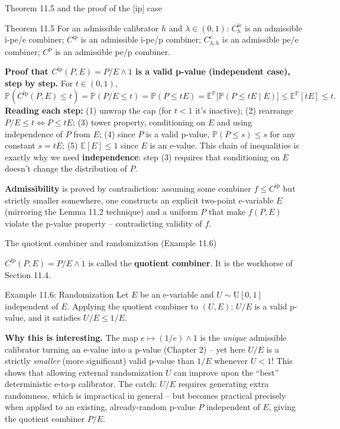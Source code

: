 \documentclass[aspectratio=169,10pt]{beamer}
\newcommand{\PP}{\mathbb{P}}
\newcommand{\EE}{\mathbb{E}}
\newcommand{\1}{\mathbb{1}}
\begin{document}
\begin{frame}[allowframebreaks]{Theorem 11.5 and the proof of the [ip] case}

\begin{block}{Theorem 11.5}
For an admissible calibrator $h$ and $\lambda\in(0,1)$: $C^{\mathrm{ie}}_h$ is an admissible i-pe/e combiner; $C^{\mathrm{ip}}$ is an admissible i-pe/p combiner; $C^{\mathrm e}_{\lambda,h}$ is an admissible pe/e combiner; $C^{\mathrm p}$ is an admissible pe/p combiner.
\end{block}

\textbf{Proof that $C^{\mathrm{ip}}(P,E)=P/E\wedge 1$ is a valid p-value (independent case), step by step.} For $t\in(0,1)$,
\[
\PP(C^{\mathrm{ip}}(P,E)\le t) = \PP(P/E\le t) = \PP(P \le tE) = \EE^\PP\bigl[\PP(P\le tE \mid E)\bigr] \le \EE^\PP[tE] \le t.
\]
\textbf{Reading each step:} (1) unwrap the cap (for $t<1$ it's inactive); (2) rearrange $P/E\le t \Leftrightarrow P\le tE$; (3) tower property, conditioning on $E$ and using independence of $P$ from $E$; (4) since $P$ is a valid p-value, $\PP(P\le s)\le s$ for any constant $s=tE$; (5) $\EE[E]\le 1$ since $E$ is an e-value. This chain of inequalities is exactly why we need \textbf{independence}: step (3) requires that conditioning on $E$ doesn't change the distribution of $P$.

\textbf{Admissibility} is proved by contradiction: assuming some combiner $f\le C^{\mathrm{ip}}$ but strictly smaller somewhere, one constructs an explicit two-point e-variable $E$ (mirroring the Lemma 11.2 technique) and a uniform $P$ that make $f(P,E)$ violate the p-value property -- contradicting validity of $f$.

\end{frame}

\begin{frame}[allowframebreaks]{The quotient combiner and randomization (Example 11.6)}

$C^{\mathrm{ip}}(P,E) = P/E \wedge 1$ is called the \textbf{quotient combiner}. It is the workhorse of Section 11.4.

\begin{block}{Example 11.6: Randomization}
Let $E$ be an e-variable and $U\sim \mathrm{U}[0,1]$ independent of $E$. Applying the quotient combiner to $(U,E)$: $U/E$ is a valid p-value, and it satisfies $U/E \le 1/E$.
\end{block}

\textbf{Why this is interesting.} The map $e\mapsto (1/e)\wedge 1$ is the \emph{unique} admissible calibrator turning an e-value into a p-value (Chapter 2) -- yet here $U/E$ is a strictly \emph{smaller} (more significant) valid p-value than $1/E$ whenever $U<1$! This shows that allowing external randomization $U$ can improve upon the ``best'' deterministic e-to-p calibrator. The catch: $U/E$ requires generating extra randomness, which is impractical in general -- but becomes practical precisely when applied to an existing, already-random p-value $P$ independent of $E$, giving the quotient combiner $P/E$.

\end{frame}
\end{document}
